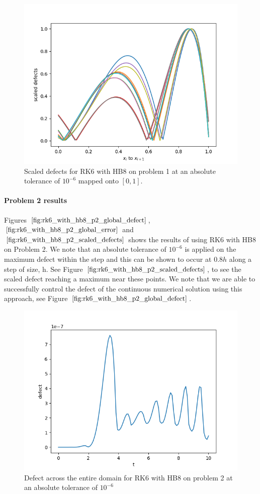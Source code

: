 \begin{figure}[H]
\centering
\includegraphics[width=0.7\linewidth]{./figures/rk6_with_hb8_p1_scaled_defects}
\caption{Scaled defects for RK6 with HB8 on problem 1 at an absolute tolerance of $10^{-6}$ mapped onto $[0, 1]$.}
\label{fig:rk6_with_hb8_p1_scaled_defects}
\end{figure}

\paragraph{Problem 2 results}
Figures $\ref{fig:rk6_with_hb8_p2_global_defect}$, $\ref{fig:rk6_with_hb8_p2_global_error}$ and $\ref{fig:rk6_with_hb8_p2_scaled_defects}$ shows the results of using RK6 with HB8 on Problem 2. We note that an absolute tolerance of $10^{-6}$ is applied on the maximum defect within the step and this can be shown to occur at $0.8h$ along a step of size, h. See Figure $\ref{fig:rk6_with_hb8_p2_scaled_defects}$, to see the scaled defect reaching a maximum near these points. We note that we are able to successfully control the defect of the continuous numerical solution using this approach, see Figure $\ref{fig:rk6_with_hb8_p2_global_defect}$. 


\begin{figure}[H]
\centering
\includegraphics[width=0.7\linewidth]{./figures/rk6_with_hb8_p2_global_defect}
\caption{Defect across the entire domain for RK6 with HB8 on problem 2 at an absolute tolerance of $10^{-6}$}
\label{fig:rk6_with_hb8_p2_global_defect}
\end{figure}

